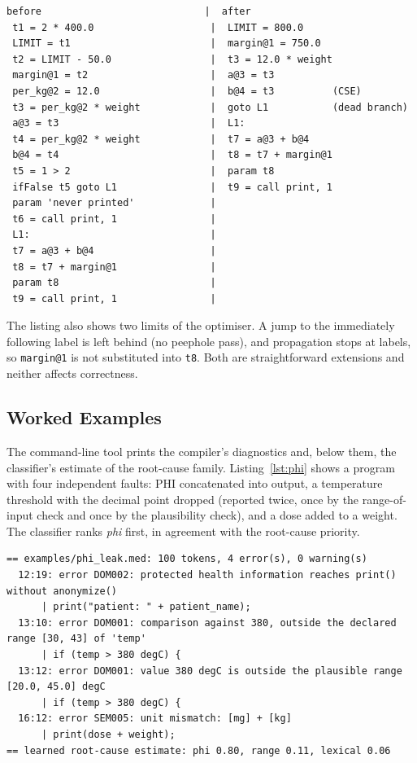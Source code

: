 \documentclass[conference]{IEEEtran}
\newcommand{\code}[1]{\texttt{#1}}
\begin{document}
\begin{lstlisting}[language={},numbers=none,caption={Three-address code of \texttt{examples/fold\_demo.med} before (left column of rows) and after optimisation.},label={lst:fold}]
 before                            |  after
 t1 = 2 * 400.0                    |  LIMIT = 800.0
 LIMIT = t1                        |  margin@1 = 750.0
 t2 = LIMIT - 50.0                 |  t3 = 12.0 * weight
 margin@1 = t2                     |  a@3 = t3
 per_kg@2 = 12.0                   |  b@4 = t3          (CSE)
 t3 = per_kg@2 * weight            |  goto L1           (dead branch)
 a@3 = t3                          |  L1:
 t4 = per_kg@2 * weight            |  t7 = a@3 + b@4
 b@4 = t4                          |  t8 = t7 + margin@1
 t5 = 1 > 2                        |  param t8
 ifFalse t5 goto L1                |  t9 = call print, 1
 param 'never printed'             |
 t6 = call print, 1                |
 L1:                               |
 t7 = a@3 + b@4                    |
 t8 = t7 + margin@1                |
 param t8                          |
 t9 = call print, 1                |
\end{lstlisting}

The listing also shows two limits of the optimiser. A jump to the immediately following label is left behind (no peephole
pass), and propagation stops at labels, so \code{margin@1} is not substituted into \code{t8}. Both are
straightforward extensions and neither affects correctness.

\subsection{Worked Examples}

The command-line tool prints the compiler's diagnostics and, below them, the classifier's estimate of the root-cause family.
Listing~\ref{lst:phi} shows a program with four independent faults: PHI concatenated into output, a temperature
threshold with the decimal point dropped (reported twice, once by the range-of-input check and once by the plausibility check), and
a dose added to a weight. The classifier ranks \emph{phi} first, in agreement with the root-cause priority.

\begin{lstlisting}[language={},numbers=none,caption={Output of \texttt{medcheck.py examples/phi\_leak.med}.},label={lst:phi}]
== examples/phi_leak.med: 100 tokens, 4 error(s), 0 warning(s)
  12:19: error DOM002: protected health information reaches print() without anonymize()
      | print("patient: " + patient_name);
  13:10: error DOM001: comparison against 380, outside the declared range [30, 43] of 'temp'
      | if (temp > 380 degC) {
  13:12: error DOM001: value 380 degC is outside the plausible range [20.0, 45.0] degC
      | if (temp > 380 degC) {
  16:12: error SEM005: unit mismatch: [mg] + [kg]
      | print(dose + weight);
== learned root-cause estimate: phi 0.80, range 0.11, lexical 0.06
\end{lstlisting}
\end{document}
